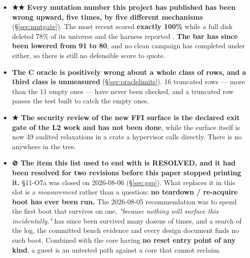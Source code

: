 \documentclass[10.5pt]{article}
\begin{document}
\begin{itemize}
  device-lifetime budget spent by early actors left later leaves unbacked, and \textbf{our own
  bound raised a host  31 } (, \S\ref{sec:seqfix}).
  It is now keyed by . \textbf{Which of two live aliases should win is
  still unproven}, and failure in this area is a function of allocation \emph{history} rather than
  size — which is why it took a campaign to find and why 
  cannot close it (its buffers never move).
\item \textbf{★★ Every mutation number this project has published has been wrong upward, five
  times, by five different mechanisms} (\S\ref{sec:mutgate}). The most recent scored
  \textbf{exactly 100\%} while a full disk deleted 78\% of its universe and the harness reported
  . \textbf{The bar has since been lowered from 91 to 80}, and no clean campaign has
  completed under either, so there is still no defensible score to quote.
\item \textbf{The C oracle is positively wrong about a whole class of rows, and a third class is
  unmeasured} (\S\ref{sec:oraclelimits}). 16 truncated rows — more than the 11 empty ones — have
  never been checked, and a truncated row passes the test built to catch the empty ones.
\item \textbf{★ The security review of the new FFI surface is the declared exit gate of the L2
  work and has not been done}, while the surface itself is now 49 audited 
  relaxations in a crate a hypervisor calls directly. There is no  anywhere in the
  tree.
\item \textbf{⊘ The item this list used to end with is RESOLVED, and it had been resolved for two
  revisions before this paper stopped printing it.} \S11-O7a was closed on 2026-08-06
  (\S\ref{sec:gsp}). What replaces it in this slot is a \emph{measurement} rather than a question:
  \textbf{no teardown / re-acquire boot has ever been run.} The 2026-08-05 recommendation was to
  spend the first boot that survives  on one, \emph{"because nothing will
  surface this incidentally."}  has since been survived many dozens of times,
  and a search of the log, the committed bench evidence and every design document finds no such
  boot. Combined with the core having \textbf{no reset entry point of any kind}, a guest
   is an untested path against a core that cannot
  reclaim.
\end{itemize}
\end{document}
